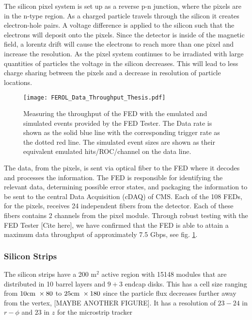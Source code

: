 The silicon pixel system is set up as a reverse p-n junction, where the pixels are in the n-type region. As a charged particle travels through the silicon it creates electron-hole pairs. A voltage difference is applied to the silicon such that the electrons will deposit onto the pixels. Since the detector is inside of the magnetic field, a lorentz drift will cause the electrons to reach more than one pixel and increase the resolution. As the pixel system continues to be irradiated with large quantities of particles the voltage in the silicon decreases. This will lead to less charge sharing between the pixels and a decrease in resolution of particle locations. 

\begin{figure}
 	\centering
	\texttt{[image: FEROL\_Data\_Throughput\_Thesis.pdf]}
 	\caption{Measuring the throughput of the FED with the emulated and simulated events provided by the FED Tester. The Data rate is shown as the solid blue line with the corresponding trigger rate as the dotted red line. The simulated event sizes are shown as their equivalent emulated hits/ROC/channel on the data line.}
 	\label{FEDThroughput} 
\end{figure}

The data, from the pixels, is sent via optical fiber to the FED where it decodes and processes the information. The FED is responsible for identifying the relevant data, determining possible error states, and packaging the information to be sent to the central Data Acquisition (cDAQ) of CMS. Each of the 108 FEDs, for the pixels, receives 24 independent fibers from the detector. Each of these fibers contains 2 channels from the pixel module. Through robust testing with the FED Tester [Cite here], we have confirmed that the FED is able to attain a maximum data throughput of approximately 7.5 Gbps, see fig. \ref{FEDThroughput}. 

\subsubsection{Silicon Strips}
\label{subsec:Strips}

The silicon strips have a 200 m$^2$ active region with 15148 modules that are distributed in 10 barrel layers and $9+3$ endcap disks.
This has a cell size ranging from $10 \text{cm } \times80$ \mum to $25 \text{cm } \times 180$ \mum since the particle flux decreases further away from the vertex, [MAYBE ANOTHER FIGURE]. It has a resolution of $23-24$ \mum in $r-\phi$ and $23$ \mum in $z$ for the microstrip tracker

